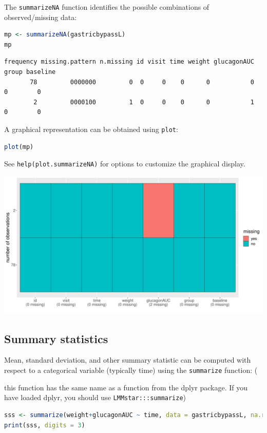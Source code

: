\documentclass[12pt]{article}
\newcommand\Warning[1][3ex]{%
\renewcommand\stacktype{L}%
\scaleto{\stackon[1.3pt]{\color{red}$\triangle$}{\tiny\bfseries !}}{#1}%
\xspace
}
\begin{document}
The \texttt{summarizeNA} function identifies the possible combinations of
observed/missing data:
\begin{lstlisting}[language=r,numbers=none]
mp <- summarizeNA(gastricbypassL)
mp
\end{lstlisting}

\label{}
\begin{verbatim}
frequency missing.pattern n.missing id visit time weight glucagonAUC group baseline
       78         0000000         0  0     0    0      0           0     0        0
        2         0000100         1  0     0    0      0           1     0        0
\end{verbatim}


A graphical representation can be obtained using \texttt{plot}:
\begin{lstlisting}[language=r,numbers=none]
plot(mp)
\end{lstlisting}

See \texttt{help(plot.summarizeNA)} for options to customize the graphical
display.

\begin{center}
\includegraphics[trim={0 0 0 0},width=1\textwidth]{./figures/summarizeNA.pdf}
\end{center}



\clearpage
\subsection{Summary statistics}
\label{sec:org8e3e350}

Mean, standard deviation, and other summary statistic can be computed
with respect to a categorical variable (typically time) using the
\texttt{summarize} function: \newline (\Warning this function has the same
name as a function from the dplyr package. If you have loaded dplyr,
you should use \texttt{LMMstar:::summarize})
\begin{lstlisting}[language=r,numbers=none]
sss <- summarize(weight+glucagonAUC ~ time, data = gastricbypassL, na.rm = TRUE)
print(sss, digits = 3)
\end{lstlisting}
\end{document}
